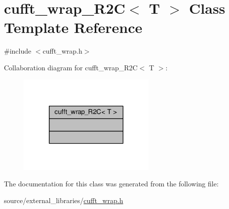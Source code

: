 \hypertarget{classcufft__wrap__R2C}{\section{cufft\-\_\-wrap\-\_\-\-R2\-C$<$ T $>$ Class Template Reference}
\label{classcufft__wrap__R2C}
}


{\ttfamily \#include $<$cufft\-\_\-wrap.\-h$>$}



Collaboration diagram for cufft\-\_\-wrap\-\_\-\-R2\-C$<$ T $>$\-:\nopagebreak
\begin{figure}[H]
\begin{center}
\leavevmode
\includegraphics[width=190pt]{classcufft__wrap__R2C__coll__graph}
\end{center}
\end{figure}


The documentation for this class was generated from the following file\-:\begin{DoxyCompactItemize}
\item 
source/external\-\_\-libraries/\hyperlink{cufft__wrap_8h}{cufft\-\_\-wrap.\-h}\end{DoxyCompactItemize}
